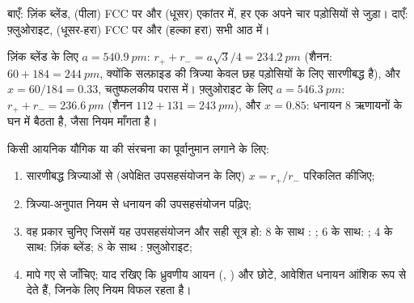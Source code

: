 \begin{omfigure}

{\small बाएँ: ज़िंक ब्लेंड,  (पीला) FCC  पर और
 (धूसर) एकांतर  में, हर एक अपने
चार पड़ोसियों से जुड़ा। दाएँ: फ़्लुओराइट,  (धूसर-हरा) FCC
 पर और  (हल्का हरा) सभी आठ  में।}
\end{omfigure}

\begin{example}[ज़िंक ब्लेंड और फ़्लुओराइट]\label{ex:b1:crystals-ionic-covalent:zns}
ज़िंक ब्लेंड के लिए $a = \qty{540.9}{pm}$: $r_+ + r_- = a\sqrt3/4 =
\qty{234.2}{pm}$ (शैनन: $60 + 184 = \qty{244}{pm}$, क्योंकि सल्फ़ाइड की त्रिज्या
केवल छह पड़ोसियों के लिए सारणीबद्ध है), और $x = 60/184 = 0.33$,
चतुष्फलकीय परास में। फ़्लुओराइट के लिए $a = \qty{546.3}{pm}$: $r_+ + r_- =
\qty{236.6}{pm}$ (शैनन $112 + 131 = \qty{243}{pm}$), और $x = 0.85$:
धनायन 8 ऋणायनों के घन में बैठता है, जैसा नियम माँगता है।
\end{example}

\begin{method}[संरचना का पूर्वानुमान]\label{met:b1:crystals-ionic-covalent:predict}
किसी आयनिक यौगिक  या  की संरचना का पूर्वानुमान लगाने के लिए:
\begin{enumerate}
  \item सारणीबद्ध त्रिज्याओं से (अपेक्षित
        उपसहसंयोजन के लिए) $x = r_+/r_-$ परिकलित कीजिए;
  \item त्रिज्या-अनुपात नियम से धनायन की उपसहसंयोजन पढ़िए;
  \item वह प्रकार चुनिए जिसमें यह उपसहसंयोजन और सही सूत्र हो:
        8 के साथ : ; 6 के साथ: ; 4 के साथ: ज़िंक ब्लेंड;
        8 के साथ : फ़्लुओराइट;
  \item मापे गए  से जाँचिए; याद रखिए कि
        ध्रुवणीय आयन (, ) और छोटे, आवेशित धनायन
        आंशिक रूप से  देते हैं, जिनके लिए नियम विफल रहता है।
\end{enumerate}
\end{method}

